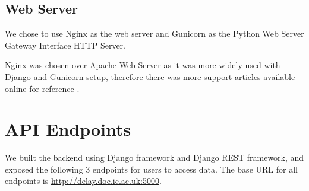 \subsection{Web Server}
We chose to use Nginx\cite{nginx} as the web server and Gunicorn\cite{gunicorn} as the Python Web Server Gateway Interface HTTP Server.

Nginx was chosen over Apache Web Server as it was more widely used with Django and Gunicorn setup, therefore there was more support articles available online for reference \cite{nginx_gunicorn_django}.

\section{API Endpoints}
\par We built the backend using Django framework and Django REST framework, and exposed the following 3 endpoints for users to access data. The base URL for all endpoints is \url{http://delay.doc.ic.ac.uk:5000}.
